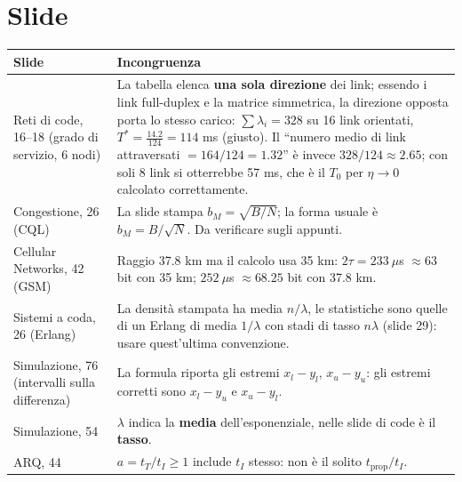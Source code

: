 \section{Slide}
\begingroup\small
\renewcommand{\arraystretch}{1.3}
\begin{tabularx}{\linewidth}{>{\raggedright\arraybackslash}p{3.2cm}X}
\toprule
Slide & Incongruenza\\
\midrule
Reti di code, 16--18 (grado di servizio, 6 nodi) & La tabella elenca \textbf{una sola direzione} dei link; essendo i link full-duplex e la matrice simmetrica, la direzione opposta porta lo stesso carico: $\sum\lambda_i=328$ su 16 link orientati, $T^*=\tfrac{14.2}{124}=114$ ms (giusto). Il ``numero medio di link attraversati $=164/124=1.32$'' è invece $328/124\approx2.65$; con soli 8 link si otterrebbe 57 ms, che è il $T_0$ per $\eta\to0$ calcolato correttamente.\\
Congestione, 26 (CQL) & La slide stampa $b_M=\sqrt{B/N}$; la forma usuale è $b_M=B/\sqrt N$. Da verificare sugli appunti.\\
Cellular Networks, 42 (GSM) & Raggio 37.8 km ma il calcolo usa 35 km: $2\tau=233\ \mu$s $\approx63$ bit con 35 km; $252\ \mu$s $\approx68.25$ bit con 37.8 km.\\
Sistemi a coda, 26 (Erlang) & La densità stampata ha media $n/\lambda$, le statistiche sono quelle di un Erlang di media $1/\lambda$ con stadi di tasso $n\lambda$ (slide 29): usare quest'ultima convenzione.\\
Simulazione, 76 (intervalli sulla differenza) & La formula riporta gli estremi $x_l-y_l$, $x_u-y_u$: gli estremi corretti sono $x_l-y_u$ e $x_u-y_l$.\\
Simulazione, 54 & $\lambda$ indica la \textbf{media} dell'esponenziale, nelle slide di code è il \textbf{tasso}.\\
ARQ, 44 & $a=t_T/t_I\ge1$ include $t_I$ stesso: non è il solito $t_{\text{prop}}/t_I$.\\
\bottomrule
\end{tabularx}
\endgroup

